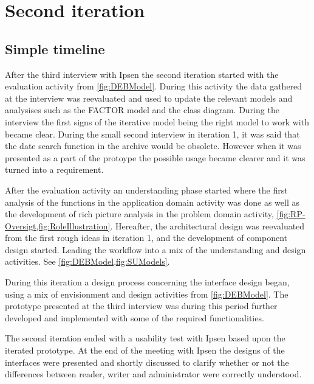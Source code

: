\section{Second iteration}
\subsection{Simple timeline}\label{sec:2Iteration-timeline}
After the third interview with Ipsen the second iteration started with the evaluation activity from \cref{fig:DEBModel}. 
During this activity the data gathered at the interview was reevaluated and used to update the relevant models and analysises such as the FACTOR model and the class diagram.
During the interview the first signs of the iterative model being the right model to work with became clear.
During the small second interview in iteration 1, it was said that the date search function in the archive would be obsolete.
However when it was presented as a part of the protoype the possible usage became clearer and it was turned into a requirement.

After the evaluation activity an understanding phase started where the first analysis of the functions in the application domain activity was done as well as the development of rich picture analysis in the problem domain activity, \cref{fig:RP-Oversigt,fig:RoleIllustration}.
Hereafter, the architectural design was reevaluated from the first rough ideas in iteration 1, and the development of component design started.
Leading the workflow into a mix of the understanding and design activities. 
See \cref{fig:DEBModel,fig:SUModels}.

During this iteration a design process concerning the interface design began, using a mix of envisionment and design activities from \cref{fig:DEBModel}.
The prototype presented at the third interview was during this period further developed and implemented with some of the required functionalities.

The second iteration ended with a usability test with Ipsen based upon the iterated prototype. 
At the end of the meeting with Ipsen the designs of the interfaces were presented and shortly discussed to clarify whether or not the differences between reader, writer and administrator were correctly understood.

